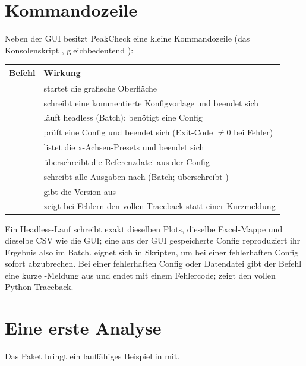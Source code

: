 \documentclass[11pt,a4paper]{article}
\begin{document}
\section{Kommandozeile}
Neben der GUI besitzt PeakCheck eine kleine Kommandozeile (das Konsolenskript
, gleichbedeutend ):

\begin{table}[h]\small\centering
\begin{tabularx}{\linewidth}{@{}l L@{}}
\toprule
\textbf{Befehl} & \textbf{Wirkung}\\
\midrule
{} & startet die grafische Oberfl\"ache\\
 & schreibt eine kommentierte Konfigvorlage und beendet sich\\
 & l\"auft headless (Batch); ben\"otigt eine Config\\
 & pr\"uft eine Config und beendet sich (Exit-Code $\neq 0$ bei Fehler)\\
 & listet die x-Achsen-Presets und beendet sich\\
 & \"uberschreibt die Referenzdatei aus der Config\\
 & schreibt alle Ausgaben nach  (Batch; \"uberschreibt )\\
 & gibt die Version aus\\
 & zeigt bei Fehlern den vollen Traceback statt einer Kurzmeldung\\
\bottomrule
\end{tabularx}
\end{table}

\noindent Ein Headless-Lauf schreibt exakt dieselben Plots, dieselbe Excel-Mappe und
dieselbe CSV wie die GUI; eine aus der GUI gespeicherte Config reproduziert ihr
Ergebnis also im Batch.  eignet sich in Skripten, um bei einer
fehlerhaften Config sofort abzubrechen. Bei einer fehlerhaften Config oder
Datendatei gibt der Befehl eine kurze -Meldung aus und endet
mit einem Fehlercode;  zeigt den vollen Python-Traceback.

\section{Eine erste Analyse}
Das Paket bringt ein lauff\"ahiges Beispiel in  mit.
\end{document}
